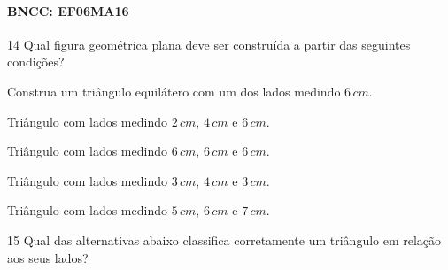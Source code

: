 {\paragraph{BNCC: EF06MA16 }


\num{14} Qual figura geométrica plana deve ser construída a partir das
seguintes condições?

Construa um triângulo equilátero com um dos lados medindo $6\,cm$.

\begin{escolha}
\item Triângulo com lados medindo $2\,cm$, $4\,cm$ e $6\,cm$. 
\item Triângulo com lados
medindo $6\,cm$, $6\,cm$ e $6\,cm$. 
\item Triângulo com lados medindo $3\,cm$, $4\,cm$ e $3\,cm$.
\item Triângulo com lados medindo $5\,cm$, $6\,cm$ e $7\,cm$.
\end{escolha}



\num{15} Qual das alternativas abaixo classifica corretamente um triângulo em
relação aos seus lados?

}
